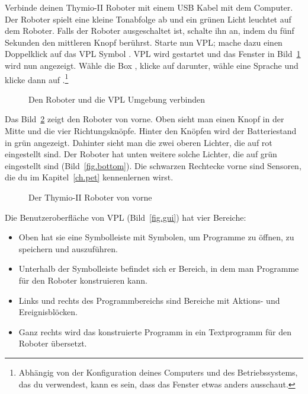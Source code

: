 

Verbinde deinen Thymio-II Roboter mit einem USB Kabel mit dem Computer. Der
Roboter spielt eine kleine Tonabfolge ab und  ein grünen Licht leuchtet auf dem
Roboter. Falls der Roboter ausgeschaltet ist, schalte ihn an, indem du fünf
Sekunden den mittleren Knopf berührst. Starte nun VPL; mache dazu einen
Doppelklick auf das VPL Symbol . VPL wird gestartet und das
Fenster in Bild~\ref{fig.connect} wird nun angezeigt. Wähle die Box
, klicke auf  darunter, wähle eine
Sprache und klicke dann auf .\footnote{Abhängig von der
Konfiguration deines Computers und des Betriebssystems, das du verwendest, kann es
sein, dass das Fenster etwas anders ausschaut.}


\begin{figure}
\begin{center}
\caption{Den Roboter und die VPL Umgebung verbinden}\label{fig.connect}
\end{center}
\end{figure} 


Das Bild~\ref{fig.front} zeigt den Roboter von vorne. Oben sieht man einen Knopf in
der Mitte und die vier Richtungsknöpfe. Hinter den Knöpfen wird der
Batteriestand in grün angezeigt. Dahinter sieht man die zwei oberen Lichter, die auf
rot eingestellt sind. Der Roboter hat unten weitere solche Lichter, die auf
grün eingestellt sind (Bild~\ref{fig.bottom}). Die schwarzen Rechtecke vorne
sind Sensoren, die du im Kapitel~\ref{ch.pet} kennenlernen wirst.

\begin{figure}
\begin{center}
\caption{Der Thymio-II Roboter von vorne}\label{fig.front}
\end{center}
\end{figure} 

\clearpage


Die Benutzeroberfläche von VPL (Bild~\ref{fig.gui}) hat vier Bereiche:

\begin{itemize}
\item Oben hat sie eine Symbolleiste mit Symbolen, um Programme zu öffnen, zu
    speichern und auszuführen.
\item Unterhalb der Symbolleiste befindet sich er Bereich, in dem man Programme 
    für den Roboter konstruieren kann.
\item Links und rechts des Programmbereichs sind Bereiche mit Aktions- und
    Ereignisblöcken.
\item Ganz rechts wird das konstruierte Programm in ein Textprogramm für den
    Roboter übersetzt.
\end{itemize}

